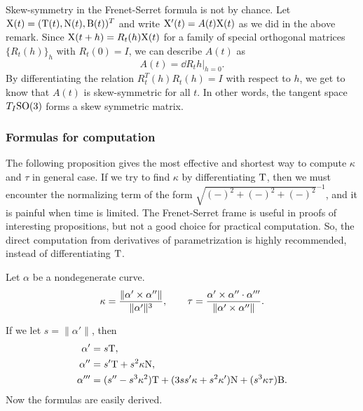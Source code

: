 \documentclass{../exp}
\def\a{\alpha}
\begin{document}
\begin{rmk}
Skew-symmetry in the Frenet-Serret formula is not by chance.
Let $\mathrm{X}(t)=(\mathrm{T}(t),\mathrm{N}(t),\mathrm{B}(t))^T$ and write $\mathrm{X}'(t)=A(t)\mathrm{X}(t)$ as we did in the above remark.
Since $\mathrm{X}(t+h)=R_t(h)\mathrm{X}(t)$ for a family of special orthogonal matrices $\{R_t(h)\}_h$ with $R_t(0)=I$, we can describe $A(t)$ as 
\[A(t)=\left.\dd{R_t}{h}\right\rvert_{h=0}.\]
By differentiating the relation $R_t^T(h)R_t(h)=I$ with respect to $h$, we get to know that $A(t)$ is skew-symmetric for all $t$.
In other words, the tangent space $T_I\mathrm{SO}(3)$ forms a skew symmetric matrix.
\end{rmk}



\subsubsection{Formulas for computation}

The following proposition gives the most effective and shortest way to compute $\kappa$ and $\tau$ in general case.
If we try to find $\kappa$ by differentiating $\mathrm{T}$, then we must encounter the normalizing term of the form $\sqrt{(-)^2+(-)^2+(-)^2}^{-1}$, and it is painful when time is limited.
The Frenet-Serret frame is useful in proofs of interesting propositions, but not a good choice for practical computation.
So, the direct computation from derivatives of parametrization is highly recommended, instead of differentiating $\mathrm{T}$.
\begin{prop}
Let $\a$ be a nondegenerate curve.
\[\kappa=\frac{\|\a'\x\a''\|}{\|\a'\|^3},\qquad\tau=\frac{\a'\x\a''\cdot\a'''}{\|\a'\x\a''\|}.\]
\end{prop}
\begin{pf}
If we let $s=\|\a'\|$, then
\begin{align*}
\a'&=s\rT,\\
\a''&=s'\rT+s^2\kappa\rN,\\
\a'''&=(s''-s^3\kappa^2)\rT+(3ss'\kappa+s^2\kappa')\rN+(s^3\kappa\tau)\rB.
\end{align*}
Now the formulas are easily derived.
\end{pf}
\end{document}
